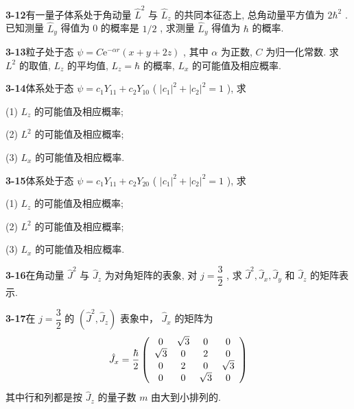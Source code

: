 \vfill

\newpage

\textbf{3-12}\quad 有一量子体系处于角动量 $\displaystyle \hat{L}^2$ 与 $\displaystyle \hat{L}_z$ 的共同本征态上, 总角动量平方值为 $\displaystyle 2\hbar^2$ . 已知测量 $\displaystyle \hat{L}_y$ 得值为 0 的概率是 $\displaystyle 1/2$ , 求测量 $\displaystyle \hat{L}_y$ 得值为 $\displaystyle \hbar$ 的概率.

\vfill

\newpage

\textbf{3-13}\quad 粒子处于态 $\displaystyle \psi = C\mathrm{e}^{-\alpha r}(x + y + 2z)$ , 其中 $\displaystyle \alpha$ 为正数, $\displaystyle C$ 为归一化常数. 求 $\displaystyle L^2$ 的取值, $\displaystyle L_z$ 的平均值, $\displaystyle L_z = \hbar$ 的概率, $\displaystyle L_x$ 的可能值及相应概率.

\vfill

\newpage

\textbf{3-14}\quad 体系处于态 $\displaystyle \psi = c_{1}Y_{11} + c_{2}Y_{10}$ ( $\displaystyle |c_1|^2 + |c_2|^2 = 1$ ), 求

(1) $\displaystyle L_{z}$ 的可能值及相应概率;

(2) $\displaystyle L^{2}$ 的可能值及相应概率;

(3) $\displaystyle L_{x}$ 的可能值及相应概率.

\vfill

\newpage

\textbf{3-15}\quad 体系处于态 $\displaystyle \psi = c_{1}Y_{11} + c_{2}Y_{20}$ ( $\displaystyle |c_1|^2 + |c_2|^2 = 1$ ), 求

(1) $\displaystyle L_{z}$ 的可能值及相应概率;

(2) $\displaystyle L^{2}$ 的可能值及相应概率;

(3) $\displaystyle L_{x}$ 的可能值及相应概率.

\vfill

\newpage

\textbf{3-16}\quad 在角动量 $\displaystyle \hat{J}^2$ 与 $\displaystyle \hat{J}_z$ 为对角矩阵的表象, 对 $\displaystyle j = \dfrac{3}{2}$ , 求 $\displaystyle \hat{J}^2, \hat{J}_x, \hat{J}_y$ 和 $\displaystyle \hat{J}_z$ 的矩阵表示.

\vfill

\newpage

\textbf{3-17}\quad 在 $\displaystyle j = \dfrac{3}{2}$ 的 $\displaystyle (\hat{J}^2, \hat{J}_z)$ 表象中， $\displaystyle \hat{J}_x$ 的矩阵为
$$
\hat {J} _ {x} = \dfrac {\hbar}{2} \left( \begin{array}{c c c c} 0 & \sqrt {3} & 0 & 0 \\ \sqrt {3} & 0 & 2 & 0 \\ 0 & 2 & 0 & \sqrt {3} \\ 0 & 0 & \sqrt {3} & 0 \end{array} \right)
$$
其中行和列都是按 $\displaystyle \hat{J}_z$ 的量子数 $\displaystyle m$ 由大到小排列的.

